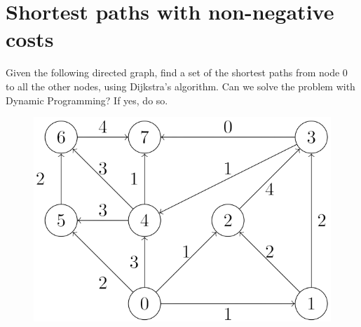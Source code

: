 \documentclass[12pt, a4paper]{report}
\newtheorem[style=M,bodystyle=\normalfont]{theorem}{Theorem}
\newtheorem[style=M,bodystyle=\normalfont]{corollary}{Corollary}
\newtheorem[style=M,bodystyle=\normalfont]{lemma}{Lemma}
\newtheorem[style=M,bodystyle=\normalfont]{definition}{Definition}
\begin{document}
    \section{Shortest paths with non-negative costs}
        Given the following directed graph, find a set of the shortest paths from node 0 to all the other nodes, using Dijkstra's algorithm. Can we solve the problem with Dynamic 
        Programming? If yes, do so.
        \begin{figure}[H]
            \centering
            \includegraphics[width=0.5\linewidth]{images/dijk.png}
        \end{figure}
\end{document}
